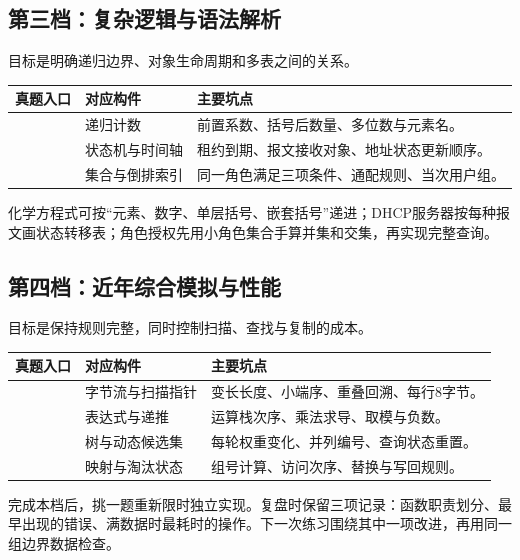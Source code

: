 \subsection{第三档：复杂逻辑与语法解析}
目标是明确递归边界、对象生命周期和多表之间的关系。
\begin{longtable}{P{5.8cm}P{3cm}P{4.9cm}}
\toprule 真题入口 & 对应构件 & 主要坑点\\\midrule\endhead
{} & 递归计数 & 前置系数、括号后数量、多位数与元素名。\\
 & 状态机与时间轴 & 租约到期、报文接收对象、地址状态更新顺序。\\
 & 集合与倒排索引 & 同一角色满足三项条件、通配规则、当次用户组。\\
\bottomrule\end{longtable}
化学方程式可按“元素、数字、单层括号、嵌套括号”递进；DHCP服务器按每种报文画状态转移表；角色授权先用小角色集合手算并集和交集，再实现完整查询。

\subsection{第四档：近年综合模拟与性能}
目标是保持规则完整，同时控制扫描、查找与复制的成本。
\begin{longtable}{P{5.8cm}P{3cm}P{4.9cm}}
\toprule 真题入口 & 对应构件 & 主要坑点\\\midrule\endhead
{} & 字节流与扫描指针 & 变长长度、小端序、重叠回溯、每行8字节。\\
 & 表达式与递推 & 运算栈次序、乘法求导、取模与负数。\\
 & 树与动态候选集 & 每轮权重变化、并列编号、查询状态重置。\\
 & 映射与淘汰状态 & 组号计算、访问次序、替换与写回规则。\\
\bottomrule\end{longtable}
完成本档后，挑一题重新限时独立实现。复盘时保留三项记录：函数职责划分、最早出现的错误、满数据时最耗时的操作。下一次练习围绕其中一项改进，再用同一组边界数据检查。
